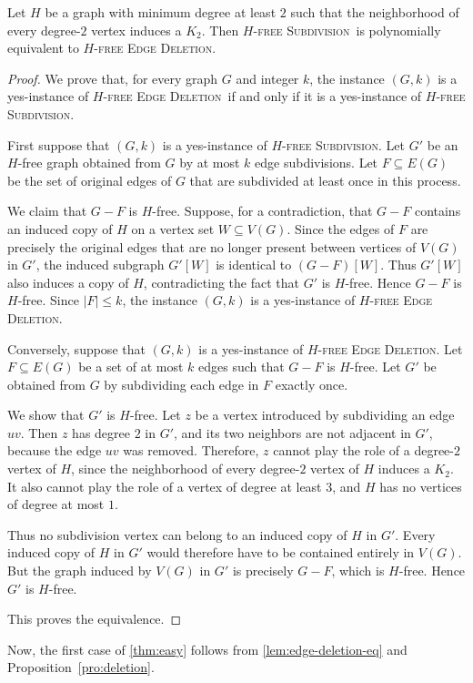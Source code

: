 \documentclass[a4paper,UKenglish,cleveref, autoref, thm-restate]{lipics-v2021}
\newcommand{\pname}[1]{\textnormal{\textsc{#1}}}
\newcommand{\HFD}{\pname{$H$-free Edge Deletion}}
\newcommand{\HFS}{\pname{$H$-free Subdivision}}
\begin{document}
\begin{lemma}
\label{lem:edge-deletion-eq}
Let $H$ be a graph with minimum degree at least $2$ such that the neighborhood
of every degree-$2$ vertex induces a $K_2$.
Then \HFS\ is polynomially equivalent to \HFD.
\end{lemma}

\begin{proof}
We prove that, for every graph $G$ and integer $k$, the instance $(G,k)$ is a
yes-instance of \HFD\ if and only if it is a yes-instance of \HFS.

First suppose that $(G,k)$ is a yes-instance of \HFS.
Let $G'$ be an $H$-free graph obtained from $G$ by at most $k$ edge
subdivisions.
Let $F\subseteq E(G)$ be the set of original edges of $G$ that are subdivided
at least once in this process.

We claim that $G-F$ is $H$-free.
Suppose, for a contradiction, that $G-F$ contains an induced copy of $H$ on a
vertex set $W\subseteq V(G)$.
Since the edges of $F$ are precisely the original edges that are no longer
present between vertices of $V(G)$ in $G'$, the induced subgraph $G'[W]$ is
identical to $(G-F)[W]$.
Thus $G'[W]$ also induces a copy of $H$, contradicting the fact that $G'$ is
$H$-free.
Hence $G-F$ is $H$-free.
Since $|F|\leq k$, the instance $(G,k)$ is a yes-instance of \HFD.

Conversely, suppose that $(G,k)$ is a yes-instance of \HFD.
Let $F\subseteq E(G)$ be a set of at most $k$ edges such that $G-F$ is
$H$-free.
Let $G'$ be obtained from $G$ by subdividing each edge in $F$ exactly once.

We show that $G'$ is $H$-free.
Let $z$ be a vertex introduced by subdividing an edge $uv$.
Then $z$ has degree $2$ in $G'$, and its two neighbors are not adjacent in
$G'$, because the edge $uv$ was removed.
Therefore, $z$ cannot play the role of a degree-$2$ vertex of $H$, since the
neighborhood of every degree-$2$ vertex of $H$ induces a $K_2$.
It also cannot play the role of a vertex of degree at least $3$, and $H$ has no
vertices of degree at most $1$.

Thus no subdivision vertex can belong to an induced copy of $H$ in $G'$.
Every induced copy of $H$ in $G'$ would therefore have to be contained entirely
in $V(G)$.
But the graph induced by $V(G)$ in $G'$ is precisely $G-F$, which is $H$-free.
Hence $G'$ is $H$-free.

This proves the equivalence.
\end{proof}

Now, the first case of \cref{thm:easy} follows from
\cref{lem:edge-deletion-eq} and Proposition~\ref{pro:deletion}.
\end{document}
